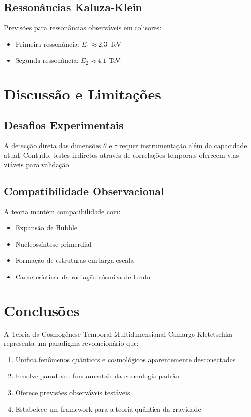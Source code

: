 \documentclass[reprint,amsmath,amssymb,aps,prd]{revtex4-2}
\begin{document}
\subsection{Ressonâncias Kaluza-Klein}

Previsões para ressonâncias observáveis em colisores:
\begin{itemize}
\item Primeira ressonância: $E_1 \approx 2.3$ TeV
\item Segunda ressonância: $E_2 \approx 4.1$ TeV
\end{itemize}

\section{Discussão e Limitações}

\subsection{Desafios Experimentais}

A detecção direta das dimensões $\theta$ e $\tau$ requer instrumentação além da capacidade atual. Contudo, testes indiretos através de correlações temporais oferecem vias viáveis para validação.

\subsection{Compatibilidade Observacional}

A teoria mantém compatibilidade com:
\begin{itemize}
\item Expansão de Hubble
\item Nucleossíntese primordial  
\item Formação de estruturas em larga escala
\item Características da radiação cósmica de fundo
\end{itemize}

\section{Conclusões}

A Teoria da Cosmogênese Temporal Multidimensional Camargo-Kletetschka representa um paradigma revolucionário que:

\begin{enumerate}
\item Unifica fenômenos quânticos e cosmológicos aparentemente desconectados
\item Resolve paradoxos fundamentais da cosmologia padrão
\item Oferece previsões observáveis testáveis
\item Estabelece um framework para a teoria quântica da gravidade
\end{enumerate}
\end{document}
